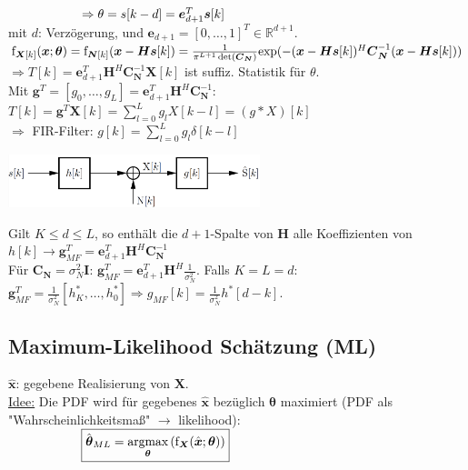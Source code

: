 \documentclass[a4paper,landscape,6pt]{article}
\newcommand{\ma}[1]{\ensuremath{\boldsymbol {#1}}}								%
\renewcommand{\vec}[1]{\ensuremath{\boldsymbol {#1}}}							%
\newcommand{\ul}[1]{\underline{#1}}
\begin{document}
\begin{multicols}{3}
$\tab \tab \Rightarrow \theta = s[k-d] = \vec e_{d+1}^T \vec s[k]$ \\
mit $d$: Verzögerung, und $\vec e_{d+1} = [0,\dots,1]^T \in \mathbb{R}^{d+1}$.\\

$\text{f}_{\vec X[k]}(\vec x; \vec \theta) = \text{f}_{\vec N[k]}(\vec x - \ma H \vec s[k]) \\
=\frac{1}{\pi^{L+1} \det(\ma C_{\vec N})} \text{exp}(-(\vec x - \ma H \vec s[k])^H \ma C_{\vec N}^{-1} (\vec x - \ma H \vec s[k]))$\\

$\Rightarrow T[k] = \vec e_{d+1}^T \ma H^H \ma C_{\vec N}^{-1} \vec X[k]$ ist suffiz. Statistik für $\theta$.\\

Mit $\vec g^T = [g_0,\dots, g_L] = \vec e_{d+1}^T \ma H^H \ma C_{\vec N}^{-1}$:\\
$T[k] = \vec g^T \vec X[k] = \sum_{l=0}^L g_l X[k-l] = (g*X)[k]$\\
$\Rightarrow$ FIR-Filter: $g[k] = \sum_{l=0}^L g_l \delta[k-l]$\\

\begin{minipage}[h]{0.35\textwidth}
	\hspace{1 cm}
	\includegraphics[width=0.55\textwidth]{images_ssp/GauFIR_2}\\
\end{minipage}
Gilt $K \le d \le L$, so enthält die $d+1$-Spalte von $\ma H$ alle Koeffizienten von $h[k] \rightarrow \vec g^T_{MF} = \vec e_{d+1}^T \ma H^H \ma C_{\vec N}^{-1}$\\

Für $\ma C_{\vec N} = \sigma_N^2 \ma I$: $\vec g^T_{MF} = \vec e_{d+1}^T \ma H^H \frac{1}{\sigma_N^2}$. Falls $K=L=d$:\\
$\vec g^T_{MF} =\frac{1}{\sigma_N^2} [h_K^*, \dots, h_0^*] \Longrightarrow g_{MF}[k] = \frac{1}{\sigma_N^2} h^*[d-k]$.
\subsection*{Maximum-Likelihood Schätzung (ML)}
$\hat{\vec x}$: gegebene Realisierung  von $\vec X$.\\
\ul{Idee:} Die PDF wird für gegebenes $\hat{\vec x}$ bezüglich $\vec \theta$ maximiert (PDF als "Wahrscheinlichkeitsmaß" $\rightarrow$ likelihood):\\
$\tab \tab \boxed{\hat{\vec \theta}_{ML} = \underset{\vec \theta}{\text{argmax}} \left( \text{f}_{\vec X}(\hat{\vec x}; \vec \theta) \right)}$\\


\end{multicols}
\end{document}
